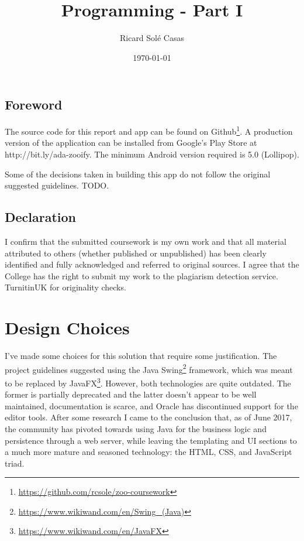\documentclass[english,a4paper,]{report}
\title{Programming - Part I}
\author{Ricard Solé Casas}
\institute{Google UK \and Ada National College for Digital Skills}
\date{\today}
\DeclareRobustCommand{\href}[2]{#2\footnote{\url{#1}}}
\begin{document}
\maketitle

\vspace*{\fill}

\section*{Foreword}

The source code for this report and app can be found on
\href{https://github.com/rcsole/zoo-coursework}{Github}. A production
version of the application can be installed from Google's Play Store at
http://bit.ly/ada-zooify. The minimum Android version required is 5.0
(Lollipop).

Some of the decisions taken in building this app do not follow the
original suggested guidelines. TODO.

\section*{Declaration}

I confirm that the submitted coursework is my own work and that all
material attributed to others (whether published or unpublished) has
been clearly identified and fully acknowledged and referred to original
sources. I agree that the College has the right to submit my work to the
plagiarism detection service. TurnitinUK for originality checks.

\vspace*{\fill}

{
\setcounter{tocdepth}{2}
\tableofcontents
}
\hypertarget{design-choices}{%
\chapter{Design Choices}\label{design-choices}}

I've made some choices for this solution that require some
justification. The project guidelines suggested using the Java
\href{https://www.wikiwand.com/en/Swing_(Java)}{Swing} framework, which
was meant to be replaced by
\href{https://www.wikiwand.com/en/JavaFX}{JavaFX}. However, both
technologies are quite outdated. The former is partially deprecated and
the latter doesn't appear to be well maintained, documentation is
scarce, and Oracle has discontinued support for the editor tools. After
some research I came to the conclusion that, as of June 2017, the
community has pivoted towards using Java for the business logic and
persistence through a web server, while leaving the templating and UI
sections to a much more mature and seasoned technology: the HTML, CSS,
and JavaScript triad.
\end{document}
